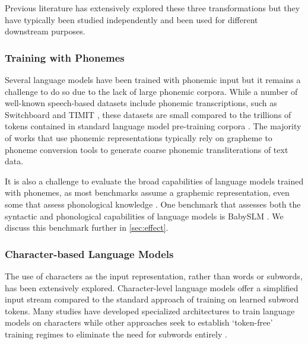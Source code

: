 Previous literature has extensively explored these three transformations but they have typically been studied independently and been used for different downstream purposes. 

\subsubsection{Training with Phonemes}

Several language models have been trained with phonemic input \citep{sundararaman-2021-phonemebert, gale-etal-2023-bort} but it remains a challenge to do so due to the lack of large phonemic corpora. While a number of well-known speech-based datasets include phonemic transcriptions, such as Switchboard \citep{godfrey1992switchboard} and TIMIT \citep{garofolo1993darpa}, these datasets are small compared to the trillions of tokens contained in standard language model pre-training corpora \citep{elazar-2024-redpajama}. The majority of works that use phonemic representations typically rely on grapheme to phoneme conversion tools \citep{bisani-2008-g2p, hasegawa-2020-g2pmultilingual} to generate coarse phonemic transliterations of text data.

It is also a challenge to evaluate the broad capabilities of language models trained with phonemes, as most benchmarks assume a graphemic representation, even some that assess phonological knowledge \citep{suvarna-etal-2024-phonologybench}. One benchmark that assesses both the syntactic and phonological capabilities of language models is BabySLM \citep{lavechin}. %
We discuss this benchmark further in \cref{sec:effect}.

\subsubsection{Character-based Language Models}

The use of characters as the input representation, rather than words or subwords, has been extensively explored. Character-level language models offer a simplified input stream compared to the standard approach of training on learned subword tokens. Many studies have developed specialized architectures to train language models on characters \citep{jozefowicz2016exploringlimitslanguagemodeling, kim2016character, ma-etal-2020-charbert, al-rfou_character-level_2019} while other approaches seek to establish `token-free' training regimes to eliminate the need for subwords entirely \citep{clark-etal-2022-canine, xue-etal-2022-byt5}.

